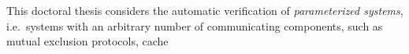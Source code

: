 
This doctoral thesis considers the automatic verification of
\emph{parameterized systems}, i.e.\ systems with an arbitrary number
of communicating components, such as mutual exclusion protocols, cache
%
% 
%
